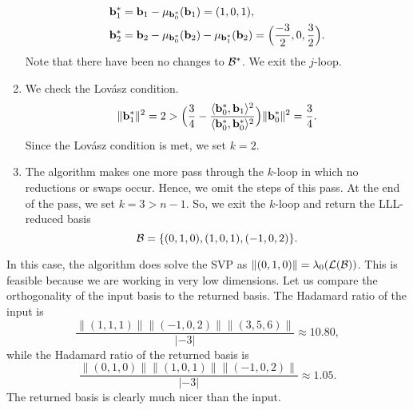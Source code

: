 \documentclass[a4paper,12pt]{article}
\begin{document}
\begin{app}
\begin{enumerate}
        \begin{align*}
            \mathbf{b}_1^{*} &= \mathbf{b}_1 - \mu_{\mathbf{b}_0^*}(\mathbf{b}_1) = (1,0,1) , \\
            \mathbf{b}_2^{*} &= \mathbf{b}_2 - \mu_{\mathbf{b}_0^*}(\mathbf{b}_2) - \mu_{\mathbf{b}_1^*}(\mathbf{b}_2) = \Big(\frac{-3}{2},0,\frac{3}{2}\Big).
        \end{align*}
        Note that there have been no changes to $\mathcal{B}^*$. We exit the $j$-loop.
    \item We check the Lov\'asz condition.
        $$\|\mathbf{b}_1^{*}\|^2 = 2 > \Big(\frac{3}{4} - \frac{\langle    \mathbf{b}_{0}^{*}, \mathbf{b}_{1} \rangle^{2}}{\langle \mathbf{b}_{0}^{*}, \mathbf{b}_{0}^{*} \rangle^{2}}\Big)\|\mathbf{b}_{0}^*\|^2 = \frac{3}{4}.$$
        Since the Lov\'asz condition is met, we set $k=2$.
    \item The algorithm makes one more pass through the $k$-loop in which no reductions or swaps occur. Hence, we omit the steps of this pass. At the end of the pass, we set $k = 3 > n-1$. So, we exit the $k$-loop and return the LLL-reduced basis $$\mathcal{B} = \lbrace (0,1,0), (1,0,1), (-1,0,2)\rbrace.$$
\end{enumerate}
In this case, the algorithm does solve the SVP as $\|(0,1,0)\| = \lambda_{0}(\mathcal{L}(\mathcal{B}))$. This is feasible because we are working in very low dimensions. Let us compare the orthogonality of the input basis to the returned basis. The Hadamard ratio of the input is $$\frac{\|(1,1,1)\|\|(-1,0,2)\|\|(3,5,6)\|}
    {
    |-3|
    } \approx 10.80, $$ while the Hadamard ratio of the returned basis is $$\frac{\|(0,1,0)\|\|(1,0,1)\|\|(-1,0,2)\|}
    {
    |-3|
    } 
    \approx 1.05.$$
    The returned basis is clearly much nicer than the input. 

\end{app}

\newpage
\end{document}

